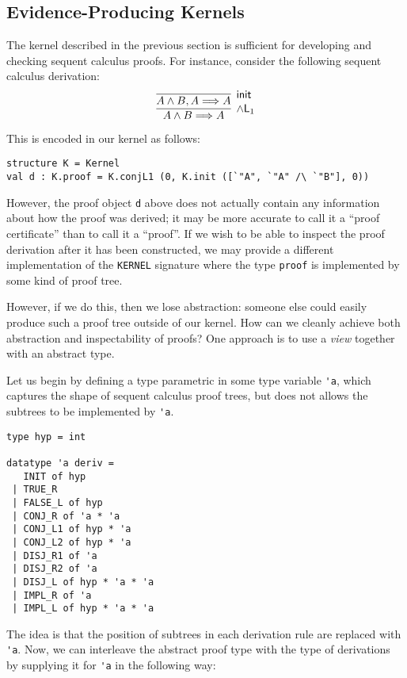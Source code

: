 \documentclass{article}
\newcommand\Seq[2]{{#1}\Longrightarrow{#2}}
\newcommand\Left[1]{{#1}\mathsf{L}}
\newcommand\RuleInit{\mathsf{init}}
\theoremstyle{definition}
\theoremstyle{remark}
\begin{document}
\subsection{Evidence-Producing Kernels}

The kernel described in the previous section is sufficient for
developing and checking sequent calculus proofs. For instance,
consider the following sequent calculus derivation:
\[
  \infer[\Left{\land}_1]{
    \Seq{A\land B}{A}
  }{
    \infer[\RuleInit]{
      \Seq{A\land B, A}{A}
    }{
    }
  }
\]

This is encoded in our kernel as follows:
\begin{verbatim}
structure K = Kernel
val d : K.proof = K.conjL1 (0, K.init ([`"A", `"A" /\ `"B"], 0))
\end{verbatim}

However, the proof object \verb|d| above does not actually contain any
information about how the proof was derived; it may be more accurate
to call it a ``proof certificate'' than to call it a ``proof''. If we
wish to be able to inspect the proof derivation after it has been
constructed, we may provide a different implementation of the
\verb|KERNEL| signature where the type \verb|proof| is implemented by
some kind of proof tree.

However, if we do this, then we lose abstraction: someone else could
easily produce such a proof tree outside of our kernel. How can we
cleanly achieve both abstraction and inspectability of proofs? One
approach is to use a \emph{view} together with an abstract type.

Let us begin by defining a type parametric in some type variable
\verb|'a|, which captures the shape of sequent calculus proof trees,
but does not allows the subtrees to be implemented by \verb|'a|.

\begin{verbatim}
type hyp = int

datatype 'a deriv =
   INIT of hyp
 | TRUE_R
 | FALSE_L of hyp
 | CONJ_R of 'a * 'a
 | CONJ_L1 of hyp * 'a
 | CONJ_L2 of hyp * 'a
 | DISJ_R1 of 'a
 | DISJ_R2 of 'a
 | DISJ_L of hyp * 'a * 'a
 | IMPL_R of 'a
 | IMPL_L of hyp * 'a * 'a
\end{verbatim}

The idea is that the position of subtrees in each derivation rule are
replaced with \verb|'a|. Now, we can interleave the abstract proof
type with the type of derivations by supplying it for \verb|'a| in the
following way:
\end{document}

